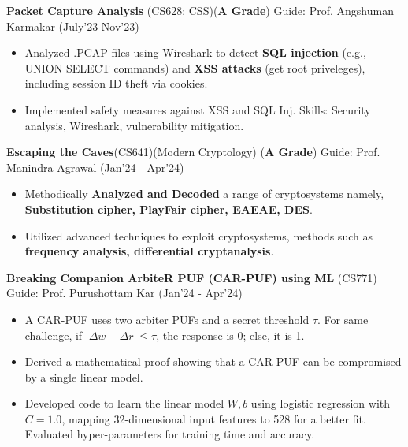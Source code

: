 \documentclass[10.8pt, a4paper]{extarticle}
\begin{document}
\vspace{2pt}

 \textbf{Packet Capture Analysis} (CS628: CSS)(\textbf{A Grade}) Guide: Prof. Angshuman Karmakar \href{https://github.com/souvikcseiitk/CS628-Computer-Systems-Security/tree/main/Assignment%204}{\faGithub{}}  \hfill(July'23-Nov'23)
	\\[-0.6cm]
	\begin{itemize}
 
          \item Analyzed .PCAP files using Wireshark to detect \textbf{SQL injection} (e.g., UNION SELECT commands) and \textbf{XSS attacks} (get root priveleges), including session ID theft via cookies.
          \item Implemented safety measures against XSS and SQL Inj. Skills: Security analysis, Wireshark, vulnerability mitigation.
           
\end{itemize}

\vspace{2pt}

\textbf{Escaping the Caves}(CS641)(Modern Cryptology) 
 (\textbf{A Grade}) Guide: Prof. Manindra Agrawal \href{https://github.com/souvikcseiitk/Escaping-the-Caves}{\faGithub{}} \hfill(Jan'24 - Apr'24)
    \\[-0.6cm]
	\begin{itemize}
	      \item  Methodically \textbf {Analyzed and Decoded} a range of cryptosystems namely, \textbf {Substitution cipher, PlayFair cipher, EAEAE,  DES}.\\[-0.6cm]
	      
	      \item  Utilized advanced techniques to exploit cryptosystems, methods such as\textbf { frequency analysis, differential cryptanalysis}.\\[-0.6cm]
	\end{itemize}
\vspace{2pt}

\textbf{Breaking Companion ArbiteR PUF (CAR-PUF) using ML} (CS771) Guide: Prof. Purushottam Kar \href{https://github.com/souvikcseiitk/Companion-Arbiter-PUF-broken-by-ML-attacks}{\faGithub{}} \hfill(Jan'24 - Apr'24)
	\\[-0.6cm]

 \begin{itemize}
    \item A CAR-PUF uses two arbiter PUFs and a secret threshold $\tau$. For same challenge, if $|\Delta w - \Delta r| \leq \tau$, the response is 0; else, it is 1.
    \item Derived a mathematical proof showing that a CAR-PUF can be compromised by a single linear model.
    \item Developed code to learn the linear model $W, b$ using logistic regression with $C=1.0$, mapping 32-dimensional input features to 528 for a better fit. Evaluated hyper-parameters for training time and accuracy.
\end{itemize}
\end{document}
